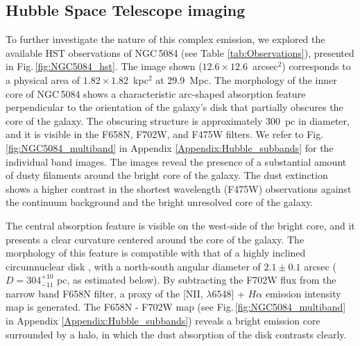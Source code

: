 \documentclass[modern]{CORE-AAS/aastex631}
\begin{document}
{\subsection{Hubble Space Telescope imaging} \label{subsec:results_hst}


To further investigate the nature of this complex emission, we explored the available HST observations of NGC\,5084 (see Table \ref{tab:Observations}), presented in Fig.\,\ref{fig:NGC5084_hst}. 
The image shown ($12.6\times12.6$~arcsec$^2$) corresponds to a physical area of $1.82\times1.82$~kpc$^2$ at 29.9~Mpc. The morphology of the inner core of NGC\,5084 shows a characteristic arc-shaped absorption feature perpendicular to the orientation of the galaxy's disk that partially obscures the core of the galaxy. The obscuring structure is approximately 300~pc in diameter, and it is visible in the F658N, F702W, and F475W filters. We refer to Fig.\,\ref{fig:NGC5084_multiband} in Appendix \ref{Appendix:Hubble_subbands} for the individual band images. The images reveal the presence of a substantial amount of dusty filaments around the bright core of the galaxy. The dust extinction shows a higher contrast in the shortest wavelength (F475W) observations against the continuum background and the bright unresolved core of the galaxy.

The central absorption feature is visible on the west-side of the bright core, and it presents a clear curvature centered around the core of the galaxy. The morphology of this feature is compatible with that of a highly inclined circumnuclear disk \citep{moellenhoff+1987aap174_63, jaffe+1993nat364_213,  kormendy+1994inproceedings_147, ferrarese+1996apj470_444, vandermarel+1998aj116_2220}, with a north-south angular diameter of $2.1\pm0.1$ arcsec ($D=304^{+10}_{-11}$ pc, as estimated below). By subtracting the F702W flux from the narrow band F658N filter, a proxy of the [NII, $\lambda$6548] + $H\alpha$ emission intensity map is generated. The F658N - F702W map (see Fig.\,\ref{fig:NGC5084_multiband} in Appendix \ref{Appendix:Hubble_subbands}) reveals a bright emission core surrounded by a halo, in which the dust absorption of the disk contrasts clearly. 

}
\end{document}
